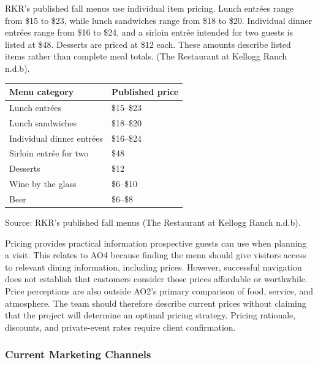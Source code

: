 \documentclass[
  12pt,
  letterpaper,
  DIV=11,
  numbers=noendperiod]{scrartcl}
\begin{document}
RKR's published fall menus use individual item pricing. Lunch entrées
range from \$15 to \$23, while lunch sandwiches range from \$18 to \$20.
Individual dinner entrées range from \$16 to \$24, and a sirloin entrée
intended for two guests is listed at \$48. Desserts are priced at \$12
each. These amounts describe listed items rather than complete meal
totals. (The Restaurant at Kellogg Ranch n.d.b).

\begin{longtable}[]{@{}
  >{\raggedright\arraybackslash}p{}
  >{\raggedleft\arraybackslash}p{}@{}}
\toprule\noalign{}
\begin{minipage}[b]{\linewidth}\raggedright
Menu category
\end{minipage} & \begin{minipage}[b]{\linewidth}\raggedleft
Published price
\end{minipage} \\
\midrule\noalign{}
\endhead
\bottomrule\noalign{}
\endlastfoot
Lunch entrées & \$15--\$23 \\
Lunch sandwiches & \$18--\$20 \\
Individual dinner entrées & \$16--\$24 \\
Sirloin entrée for two & \$48 \\
Desserts & \$12 \\
Wine by the glass & \$6--\$10 \\
Beer & \$6--\$8 \\
\end{longtable}

Source: RKR's published fall menus (The Restaurant at Kellogg Ranch
n.d.b).

Pricing provides practical information prospective guests can use when
planning a visit. This relates to AO4 because finding the menu should
give visitors access to relevant dining information, including prices.
However, successful navigation does not establish that customers
consider those prices affordable or worthwhile. Price perceptions are
also outside AO2's primary comparison of food, service, and atmosphere.
The team should therefore describe current prices without claiming that
the project will determine an optimal pricing strategy. Pricing
rationale, discounts, and private-event rates require client
confirmation.

\subsubsection{Current Marketing
Channels}\label{current-marketing-channels}
\end{document}

